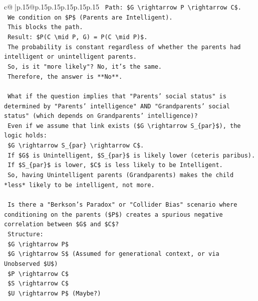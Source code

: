 \documentclass{article}
\begin{document}
{\begin{supertabular}{c@{$\;$}|p{.15\linewidth}@{}p{.15\linewidth}p{.15\linewidth}p{.15\linewidth}p{.15\linewidth}p{.15\linewidth}}
{{{\texttt{    Path: \$G \textbackslash{}rightarrow P \textbackslash{}rightarrow C\$.} \\
\texttt{    We condition on \$P\$ (Parents are Intelligent).} \\
\texttt{    This blocks the path.} \\
\texttt{    Result: \$P(C \textbackslash{}mid P, G) = P(C \textbackslash{}mid P)\$.} \\
\texttt{    The probability is constant regardless of whether the parents had intelligent or unintelligent parents.} \\
\texttt{    So, is it "more likely"? No, it's the same.} \\
\texttt{    Therefore, the answer is **No**.} \\
\\ 
\texttt{    What if the question implies that "Parents' social status" is determined by "Parents' intelligence" AND "Grandparents' social status" (which depends on Grandparents' intelligence)?} \\
\texttt{    Even if we assume that link exists (\$G \textbackslash{}rightarrow S\_\{par\}\$), the logic holds:} \\
\texttt{    \$G \textbackslash{}rightarrow S\_\{par\} \textbackslash{}rightarrow C\$.} \\
\texttt{    If \$G\$ is Unintelligent, \$S\_\{par\}\$ is likely lower (ceteris paribus).} \\
\texttt{    If \$S\_\{par\}\$ is lower, \$C\$ is less likely to be Intelligent.} \\
\texttt{    So, having Unintelligent parents (Grandparents) makes the child *less* likely to be intelligent, not more.} \\
\\ 
\texttt{    Is there a "Berkson's Paradox" or "Collider Bias" scenario where conditioning on the parents (\$P\$) creates a spurious negative correlation between \$G\$ and \$C\$?} \\
\texttt{    Structure:} \\
\texttt{    \$G \textbackslash{}rightarrow P\$} \\
\texttt{    \$G \textbackslash{}rightarrow S\$ (Assumed for generational context, or via Unobserved \$U\$)} \\
\texttt{    \$P \textbackslash{}rightarrow C\$} \\
\texttt{    \$S \textbackslash{}rightarrow C\$} \\
\texttt{    \$U \textbackslash{}rightarrow P\$ (Maybe?)} \\
}}}
\end{supertabular}}
\end{document}
